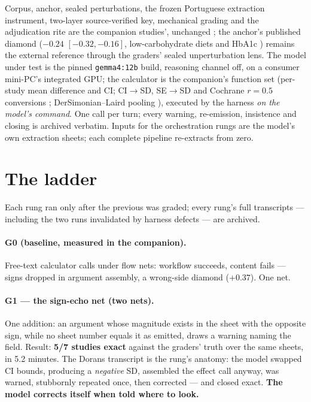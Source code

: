 \documentclass[11pt]{article}
\begin{document}
Corpus, anchor, sealed perturbations, the frozen Portuguese extraction instrument, two-layer source-verified key, mechanical grading and the adjudication rite are the companion studies', unchanged \citep{barra2026companion}; the anchor's published diamond ($-0.24$ $[-0.32, -0.16]$, low-carbohydrate diets and HbA1c \citep{khraise2026lowcarb}) remains the external reference through the graders' sealed unperturbation lens. The model under test is the pinned \texttt{gemma4:12b} build, reasoning channel off, on a consumer mini-PC's integrated GPU; the calculator is the companion's function set (per-study mean difference and CI; CI$\to$SD, SE$\to$SD and Cochrane $r{=}0.5$ conversions \citep{higgins2023handbook}; DerSimonian--Laird pooling \citep{dersimonian1986meta}), executed by the harness \emph{on the model's command}. One call per turn; every warning, re-emission, insistence and closing is archived verbatim. Inputs for the orchestration rungs are the model's own extraction sheets; each complete pipeline re-extracts from zero.

\section{The ladder}

Each rung ran only after the previous was graded; every rung's full transcripts --- including the two runs invalidated by harness defects --- are archived.

\paragraph{G0 (baseline, measured in the companion).} Free-text calculator calls under flow nets: workflow succeeds, content fails --- signs dropped in argument assembly, a wrong-side diamond ($+0.37$). One net.

\paragraph{G1 --- the sign-echo net (two nets).} One addition: an argument whose magnitude exists in the sheet with the opposite sign, while no sheet number equals it as emitted, draws a warning naming the field. Result: \textbf{5/7 studies exact} against the graders' truth over the same sheets, in 5.2 minutes. The Dorans transcript is the rung's anatomy: the model swapped CI bounds, producing a \emph{negative} SD, assembled the effect call anyway, was warned, stubbornly repeated once, then corrected --- and closed exact. \textbf{The model corrects itself when told where to look.}
\end{document}
